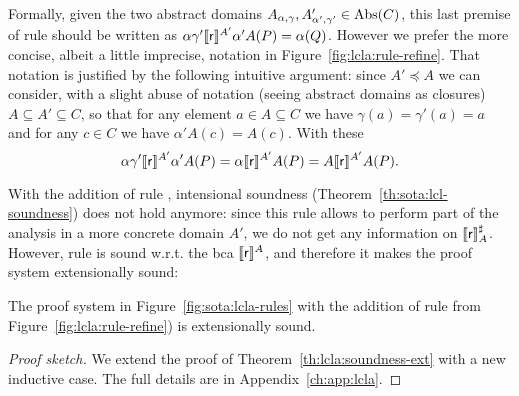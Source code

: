 Formally, given the two abstract domains $A_{\alpha, \gamma}, A'_{\alpha', \gamma'} \in \text{\normalfont Abs}(C)$, this last premise of rule  should be written as $\alpha \gamma' \llbracket\mathsf{r}\rrbracket^{A'} \alpha' A(P) = \alpha(Q)$. However we prefer the more concise, albeit a little imprecise, notation in Figure~\ref{fig:lcla:rule-refine}. That notation is justified by the following intuitive argument: since $A' \preceq A$ we can consider, with a slight abuse of notation (seeing abstract domains as closures) $A \subseteq A' \subseteq C$, so that for any element $a \in A \subseteq C$ we have $\gamma(a) = \gamma'(a) = a$ and for any $c \in C$ we have $\alpha' A(c) = A(c)$. With these
\[
\alpha \gamma' \llbracket\mathsf{r}\rrbracket^{A'} \alpha' A(P) = \alpha \llbracket\mathsf{r}\rrbracket^{A'} A(P) = A \llbracket\mathsf{r}\rrbracket^{A'} A(P) .
\]

With the addition of rule , intensional soundness (Theorem~\ref{th:sota:lcl-soundness}) does not hold anymore: since this rule allows to perform part of the analysis in a more concrete domain $A'$, we do not get any information on $\llbracket\mathsf{r}\rrbracket^{\sharp}_A$. However, rule  is sound w.r.t. the bca $\llbracket\mathsf{r}\rrbracket^A$, and therefore it makes the proof system extensionally sound:

\begin{theorem}\label{th:lcla:soundness-rule-refine}
	The proof system in Figure~\ref{fig:sota:lcla-rules} with the addition of rule  from Figure~\ref{fig:lcla:rule-refine}) is extensionally sound.
\end{theorem}
\begin{proof}[Proof sketch]
	We extend the proof of Theorem~\ref{th:lcla:soundness-ext} with a new inductive case. The full details are in Appendix~\ref{ch:app:lcla}.
\end{proof}

